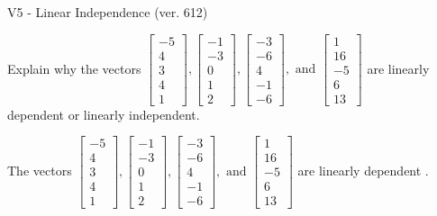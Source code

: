 \begin{exercise}
  \begin{exerciseTitle}V5 - Linear Independence (ver. 612)\end{exerciseTitle}
  \begin{exerciseStatement}
    Explain why the vectors \(\left[\begin{array}{r}
-5 \\
4 \\
3 \\
4 \\
1
\end{array}\right] , \left[\begin{array}{r}
-1 \\
-3 \\
0 \\
1 \\
2
\end{array}\right] , \left[\begin{array}{r}
-3 \\
-6 \\
4 \\
-1 \\
-6
\end{array}\right] , \text{ and } \left[\begin{array}{r}
1 \\
16 \\
-5 \\
6 \\
13
\end{array}\right]\) are linearly dependent or linearly independent.	


  \end{exerciseStatement}
  \begin{exerciseAnswer}
   The vectors \(\left[\begin{array}{r}
-5 \\
4 \\
3 \\
4 \\
1
\end{array}\right] , \left[\begin{array}{r}
-1 \\
-3 \\
0 \\
1 \\
2
\end{array}\right] , \left[\begin{array}{r}
-3 \\
-6 \\
4 \\
-1 \\
-6
\end{array}\right] , \text{ and } \left[\begin{array}{r}
1 \\
16 \\
-5 \\
6 \\
13
\end{array}\right]\) are 
  	 linearly dependent  .
  


  \end{exerciseAnswer}
\end{exercise}